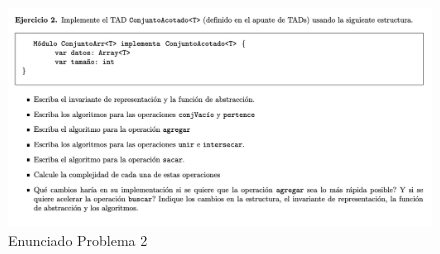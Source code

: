 \documentclass[10pt,a4paper]{article}
\begin{document}
\newpage

\begin{figure}[h]
  \centering
  \includegraphics[width=\textwidth]{images/nuevo_ejercicio_2.png}
  \caption{Enunciado Problema 2}
  \label{fig:ej_2}
\end{figure}
\vspace{1em}
\end{document}
